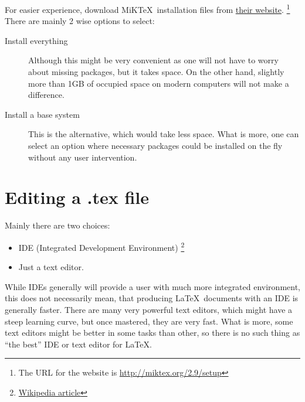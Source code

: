 \documentclass[a4paper]{article}
\newcommand{\MiKTeX}{MiK\TeX}
\begin{document}
For easier experience, download \MiKTeX\ installation files from
\href{http://miktex.org/2.9/setup}{their website}.
\footnote{The URL for the website is \url{http://miktex.org/2.9/setup}}
There are mainly 2 wise options to select:
\begin{description}
    \item[Install everything] Although this might be very convenient as
        one will not have to worry about missing packages, but it takes space.
        On the other hand, slightly more than 1GB of occupied space on modern
        computers will not make a difference.
    \item[Install a base system] This is the alternative, which would take less
        space. What is more, one can select an option where necessary packages
        could be installed on the fly without any user intervention.
\end{description}

\section{Editing a .tex file}

Mainly there are two choices:
\begin{itemize}
    \item IDE (Integrated Development Environment)
        \footnote{\href{https://secure.wikimedia.org/wikipedia/en/wiki/Integrated_development_environment}{Wikipedia
        article}}
    \item Just a text editor.
\end{itemize}

While IDEs generally will provide a user with much more integrated environment,
this does not necessarily mean, that producing \LaTeX\ documents with an IDE is
generally faster. There are many very powerful text editors, which might have a
steep learning curve, but once mastered, they are very fast. What is more, some
text editors might be better in some tasks than other, so there is no such thing
as ``the best'' IDE or text editor for \LaTeX.
\end{document}
